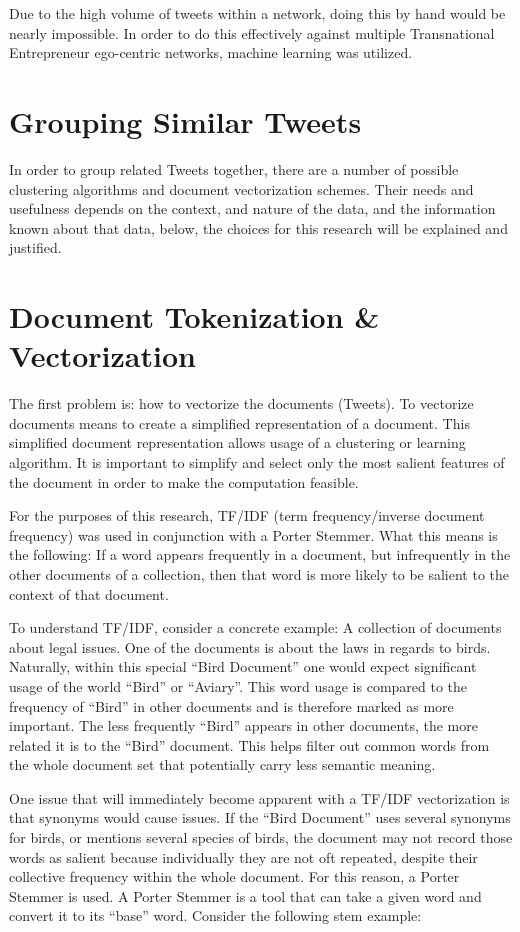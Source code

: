 Due to the high volume of tweets within a network, doing this by hand
would be nearly impossible. In order to do this effectively against
multiple Transnational Entrepreneur ego-centric networks, machine
learning was utilized.

\section{Grouping Similar Tweets}
In order to group related Tweets together, there are a number of
possible clustering algorithms and document vectorization
schemes. Their needs and usefulness depends on the context, and nature
of the data, and the information known about that data, below, the
choices for this research will be explained and justified.

\section{Document Tokenization \& Vectorization}
The first problem is: how to vectorize the documents (Tweets). To
vectorize documents means to create a simplified representation of a
document. This simplified document representation allows usage of a
clustering or learning algorithm. It is important to simplify and
select only the most salient features of the document in order to make
the computation feasible.

For the purposes of this research, TF/IDF (term frequency/inverse
document frequency) was used in conjunction with a Porter
Stemmer. What this means is the following: If a word appears
frequently in a document, but infrequently in the other documents of a
collection, then that word is more likely to be salient to the context
of that document.

To understand TF/IDF, consider a concrete example: A collection of
documents about legal issues. One of the documents is about the laws
in regards to birds. Naturally, within this special ``Bird Document''
one would expect significant usage of the world ``Bird'' or
``Aviary''. This word usage is compared to the frequency of ``Bird''
in other documents and is therefore marked as more important. The less
frequently ``Bird'' appears in other documents, the more related it is
to the ``Bird'' document. This helps filter out common words from the
whole document set that potentially carry less semantic meaning.

One issue that will immediately become apparent with a TF/IDF
vectorization is that synonyms would cause issues. If the ``Bird
Document'' uses several synonyms for birds, or mentions several
species of birds, the document may not record those words as salient
because individually they are not oft repeated, despite their
collective frequency within the whole document. For this reason,
a Porter Stemmer is used. A Porter Stemmer is a tool that can take
a given word and convert it to its ``base'' word. Consider the following
stem example:


